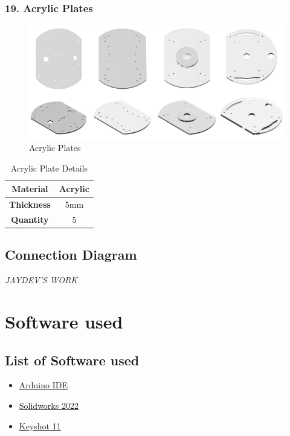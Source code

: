 \documentclass[12pt,a4paper,oneside]{book}
\begin{document}
			\subsubsection*{19. Acrylic Plates}
				\begin{center}
					\begin{figure}[H]
						\includegraphics[scale=1]{PLATES FULL}
						\caption{Acrylic Plates}	 
					\end{figure}
				\end{center}
				\begin{table}[H]
				\centering
				\def\arraystretch{1.5}
					\caption{Acrylic Plate Details}
					\vspace{0.5cm}
					\begin{tabular}{|c||c|}
						\hline
						\textbf{Material} & Acrylic\\\hline
						\textbf{Thickness} & 5mm\\\hline
						\textbf{Quantity} & 5\\\hline						
					\end{tabular}
				\end{table}
				\pagebreak
			
		\subsection*{Connection Diagram}
			\begin{huge}
				\textit{JAYDEV'S WORK}
			\end{huge}
			\pagebreak
			

	\section*{Software used}
		\subsection*{List of Software used}
			\begin{itemize}
				\item \href{https://www.arduino.cc/en/software}{Arduino IDE}
				\item \href{https://www.solidworks.com/sw/support/downloads.htm}{Solidworks 2022}
			    \item \href{https://www.keyshot.com/direct-downloads/}{Keyshot 11}
			\end{itemize}
			\pagebreak
			
\end{document}
